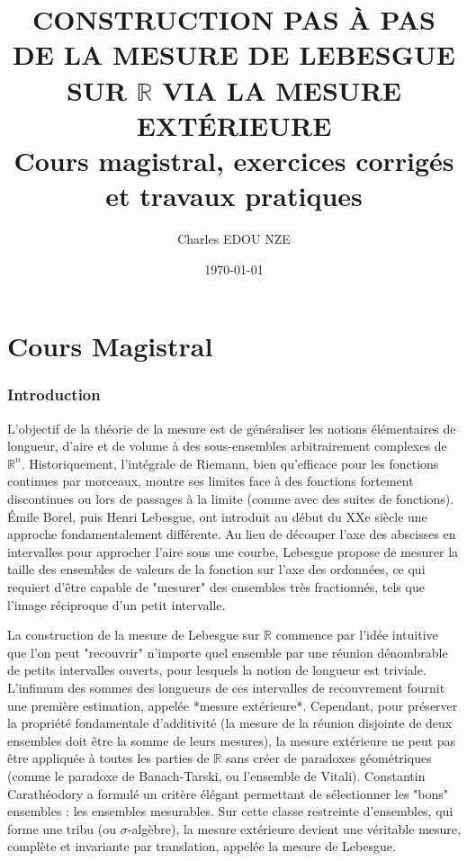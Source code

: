 \documentclass[11pt,a4paper]{article}
\title{\Huge CONSTRUCTION PAS À PAS DE LA MESURE DE LEBESGUE SUR $\mathbb{R}$ VIA LA MESURE EXTÉRIEURE \\ \large Cours magistral, exercices corrigés et travaux pratiques}
\author{\Large Charles EDOU NZE}
\date{\today}
\begin{document}
\maketitle
\tableofcontents
\newpage

\part{Cours Magistral}


\section{Introduction}

L'objectif de la théorie de la mesure est de généraliser les notions élémentaires de longueur, d'aire et de volume à des sous-ensembles arbitrairement complexes de $\mathbb{R}^n$. Historiquement, l'intégrale de Riemann, bien qu'efficace pour les fonctions continues par morceaux, montre ses limites face à des fonctions fortement discontinues ou lors de passages à la limite (comme avec des suites de fonctions). Émile Borel, puis Henri Lebesgue, ont introduit au début du XXe siècle une approche fondamentalement différente. Au lieu de découper l'axe des abscisses en intervalles pour approcher l'aire sous une courbe, Lebesgue propose de mesurer la taille des ensembles de valeurs de la fonction sur l'axe des ordonnées, ce qui requiert d'être capable de "mesurer" des ensembles très fractionnés, tels que l'image réciproque d'un petit intervalle.

La construction de la mesure de Lebesgue sur $\mathbb{R}$ commence par l'idée intuitive que l'on peut "recouvrir" n'importe quel ensemble par une réunion dénombrable de petits intervalles ouverts, pour lesquels la notion de longueur est triviale. L'infimum des sommes des longueurs de ces intervalles de recouvrement fournit une première estimation, appelée *mesure extérieure*. Cependant, pour préserver la propriété fondamentale d'additivité (la mesure de la réunion disjointe de deux ensembles doit être la somme de leurs mesures), la mesure extérieure ne peut pas être appliquée à toutes les parties de $\mathbb{R}$ sans créer de paradoxes géométriques (comme le paradoxe de Banach-Tarski, ou l'ensemble de Vitali). Constantin Carathéodory a formulé un critère élégant permettant de sélectionner les "bons" ensembles : les ensembles mesurables. Sur cette classe restreinte d'ensembles, qui forme une tribu (ou $\sigma$-algèbre), la mesure extérieure devient une véritable mesure, complète et invariante par translation, appelée la mesure de Lebesgue.
\end{document}
